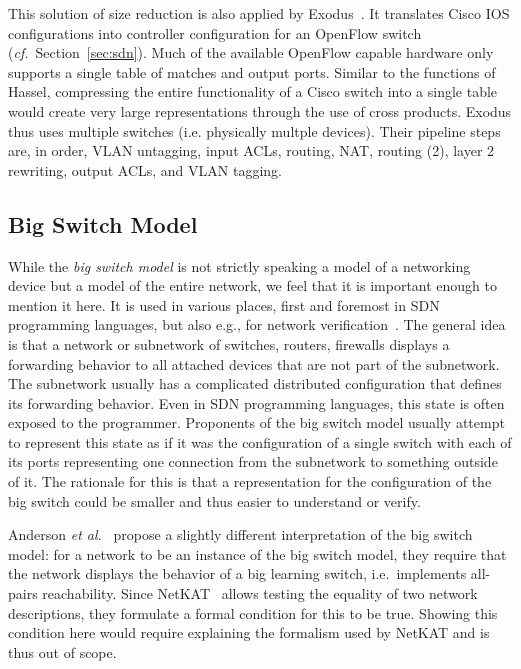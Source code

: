 This solution of size reduction is also applied by Exodus~\cite{nelson2015exodus}.
It translates Cisco IOS configurations into controller configuration for an OpenFlow switch (\emph{cf.}\ Section~\ref{sec:sdn}).
Much of the available OpenFlow capable hardware only supports a single table of matches and output ports.
Similar to the functions of Hassel, compressing the entire functionality of a Cisco switch into a single table would create very large representations through the use of cross products.
Exodus thus uses multiple switches (i.e. physically multple devices).
Their pipeline steps are, in order, VLAN untagging, input ACLs, routing, NAT, routing (2), layer 2 rewriting, output ACLs, and VLAN tagging.

\subsection{Big Switch Model}\label{sec:bsw}
While the \emph{big switch model} is not strictly speaking a model of a networking device but a model of the entire network, we feel that it is important enough to mention it here.
It is used in various places, first and foremost in SDN \cite{casado2010virtualizing,kang2013optimizing,monsanto2013composing} programming languages, but also e.g., for network verification~\cite{anderson2014netkat}.
The general idea is that a network or subnetwork of switches, routers, firewalls displays a forwarding behavior to all attached devices that are not part of the subnetwork.
The subnetwork usually has a complicated distributed configuration that defines its forwarding behavior.
Even in SDN programming languages, this state is often exposed to the programmer.
Proponents of the big switch model usually attempt to represent this state as if it was the configuration of a single switch with each of its ports representing one connection from the subnetwork to something outside of it.
The rationale for this is that a representation for the configuration of the big switch could be smaller and thus easier to understand or verify.

Anderson \emph{et al.}~\cite{anderson2014netkat} propose a slightly different interpretation of the big switch model: for a network to be an instance of the big switch model, they require that the network displays the behavior of a big learning switch, i.e.\ implements all-pairs reachability.
Since NetKAT~\cite{anderson2014netkat} allows testing the equality of two network descriptions, they formulate a formal condition for this to be true.
Showing this condition here would require explaining the formalism used by NetKAT and is thus out of scope.
